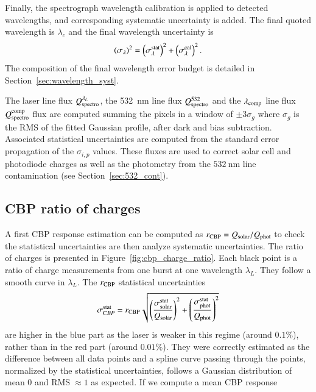 Finally, the spectrograph wavelength calibration is applied to detected wavelengths, and corresponding systematic uncertainty is added. The final quoted wavelength is $\lambda_c$ and the final wavelength uncertainty is
\begin{equation}
  \left(\sigma_{\lambda}\right)^2 =  \left(\sigma_{\lambda}^{\rm stat}\right)^2 +  \left(\sigma_{\lambda}^{\rm cal}\right)^2.   
\end{equation}
The composition of the final wavelength error budget is detailed in Section~\ref{sec:wavelength_syst}.

The laser line flux $Q_{\mathrm{spectro}}^{\lambda_L}$, the \SI{532}{\nm} line flux $Q_{\mathrm{spectro}}^{532}$ and the $\lambda_{\rm comp}$ line flux $Q_{\mathrm{spectro}}^{\rm comp}$ flux are computed summing the pixels in a window of $\pm 3 \sigma_g$ where $\sigma_g$ is the RMS of the fitted Gaussian profile, after dark and bias subtraction. Associated statistical uncertainties are computed from the standard error propagation of the $\sigma_{i,p}$ values. These fluxes are used to correct solar cell and photodiode charges as well as the \SD photometry from the $\SI{532}{\nm}$ line contamination (see Section~\ref{sec:532_cont}).  %

\subsection{CBP ratio of charges}

A first CBP response estimation can be computed as $r_{\rm CBP} = Q_{\mathrm{solar}}/Q_{\mathrm{phot}}$ to check the statistical uncertainties are then analyze systematic uncertainties. The ratio of charges is presented in Figure~\ref{fig:cbp_charge_ratio}. Each black point is a ratio of charge measurements from one burst at one wavelength $\lambda_L$. They follow a smooth curve in $\lambda_L$. The $r_{\rm CBP}$ statistical uncertainties 
\begin{equation}
    \sigma_{\mathrm CBP}^{\rm stat} = r_{\rm CBP} \sqrt{\left(\frac{\sigma_{\mathrm{solar}}^{\mathrm{stat}}}{Q_{\mathrm{solar}}}\right)^2 +  \left(\frac{\sigma_{\mathrm{phot}}^{\mathrm{stat}}}{Q_{\mathrm{phot}}}\right)^2 }
\end{equation}
are higher in the blue part as the laser is weaker in this regime (around $0.1\%$), rather than in the red part (around $0.01\%$). They were correctly estimated as the difference between all data points and a spline curve passing through the points, normalized by the statistical uncertainties, follows a Gaussian distribution of mean 0 and RMS$\;\approx 1$ as expected. If we compute a mean CBP response

